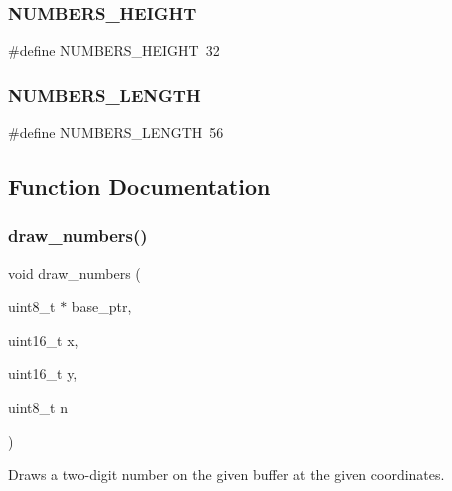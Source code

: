 \subsubsection{\texorpdfstring{N\+U\+M\+B\+E\+R\+S\+\_\+\+H\+E\+I\+G\+HT}{NUMBERS\_HEIGHT}}
{\footnotesize\ttfamily \#define N\+U\+M\+B\+E\+R\+S\+\_\+\+H\+E\+I\+G\+HT~32}

\mbox{\label{group__numbers_ga25023eab36552ec9843c325b07ba20f8}} 
\subsubsection{\texorpdfstring{N\+U\+M\+B\+E\+R\+S\+\_\+\+L\+E\+N\+G\+TH}{NUMBERS\_LENGTH}}
{\footnotesize\ttfamily \#define N\+U\+M\+B\+E\+R\+S\+\_\+\+L\+E\+N\+G\+TH~56}



\subsection{Function Documentation}
\mbox{\label{group__numbers_ga957a3e5ec5d985ee4c890b5f34ac9511}} 
\subsubsection{\texorpdfstring{draw\+\_\+numbers()}{draw\_numbers()}}
{\footnotesize\ttfamily void draw\+\_\+numbers (\begin{DoxyParamCaption}\item[{uint8\+\_\+t $\ast$}]{base\+\_\+ptr,  }\item[{uint16\+\_\+t}]{x,  }\item[{uint16\+\_\+t}]{y,  }\item[{uint8\+\_\+t}]{n }\end{DoxyParamCaption})}



Draws a two-\/digit number on the given buffer at the given coordinates. 


